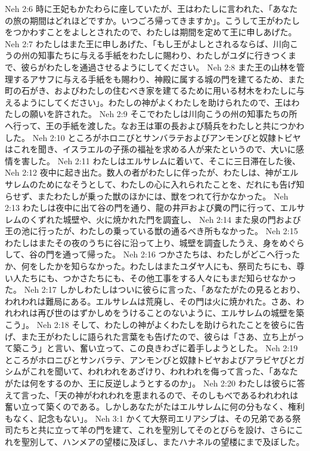 Neh 2:6  時に王妃もかたわらに座していたが、王はわたしに言われた、「あなたの旅の期間はどれほどですか。いつごろ帰ってきますか」。こうして王がわたしをつかわすことをよしとされたので、わたしは期間を定めて王に申しあげた。
Neh 2:7  わたしはまた王に申しあげた、「もし王がよしとされるならば、川向こうの州の知事たちに与える手紙をわたしに賜わり、わたしがユダに行きつくまで、彼らがわたしを通過させるようにしてください。
Neh 2:8  また王の山林を管理するアサフに与える手紙をも賜わり、神殿に属する城の門を建てるため、また町の石がき、およびわたしの住むべき家を建てるために用いる材木をわたしに与えるようにしてください」。わたしの神がよくわたしを助けられたので、王はわたしの願いを許された。
Neh 2:9  そこでわたしは川向こうの州の知事たちの所へ行って、王の手紙を渡した。なお王は軍の長および騎兵をわたしと共につかわした。
Neh 2:10  ところがホロニびとサンバラテおよびアンモンびと奴隷トビヤはこれを聞き、イスラエルの子孫の福祉を求める人が来たというので、大いに感情を害した。
Neh 2:11  わたしはエルサレムに着いて、そこに三日滞在した後、
Neh 2:12  夜中に起き出た。数人の者がわたしに伴ったが、わたしは、神がエルサレムのためになそうとして、わたしの心に入れられたことを、だれにも告げ知らせず、またわたしが乗った獣のほかには、獣をつれて行かなかった。
Neh 2:13  わたしは夜中に出て谷の門を通り、龍の井戸および糞の門に行って、エルサレムのくずれた城壁や、火に焼かれた門を調査し、
Neh 2:14  また泉の門および王の池に行ったが、わたしの乗っている獣の通るべき所もなかった。
Neh 2:15  わたしはまたその夜のうちに谷に沿って上り、城壁を調査したうえ、身をめぐらして、谷の門を通って帰った。
Neh 2:16  つかさたちは、わたしがどこへ行ったか、何をしたかを知らなかった。わたしはまたユダヤ人にも、祭司たちにも、尊い人たちにも、つかさたちにも、その他工事をする人々にもまだ知らせなかった。
Neh 2:17  しかしわたしはついに彼らに言った、「あなたがたの見るとおり、われわれは難局にある。エルサレムは荒廃し、その門は火に焼かれた。さあ、われわれは再び世のはずかしめをうけることのないように、エルサレムの城壁を築こう」。
Neh 2:18  そして、わたしの神がよくわたしを助けられたことを彼らに告げ、また王がわたしに語られた言葉をも告げたので、彼らは「さあ、立ち上がって築こう」と言い、奮い立って、この良きわざに着手しようとした。
Neh 2:19  ところがホロニびとサンバラテ、アンモンびと奴隷トビヤおよびアラビヤびとガシムがこれを聞いて、われわれをあざけり、われわれを侮って言った、「あなたがたは何をするのか、王に反逆しようとするのか」。
Neh 2:20  わたしは彼らに答えて言った、「天の神がわれわれを恵まれるので、そのしもべであるわれわれは奮い立って築くのである。しかしあなたがたはエルサレムに何の分もなく、権利もなく、記念もない」。
Neh 3:1  かくて大祭司エリアシブは、その兄弟である祭司たちと共に立って羊の門を建て、これを聖別してそのとびらを設け、さらにこれを聖別して、ハンメアの望楼に及ぼし、またハナネルの望楼にまで及ぼした。

